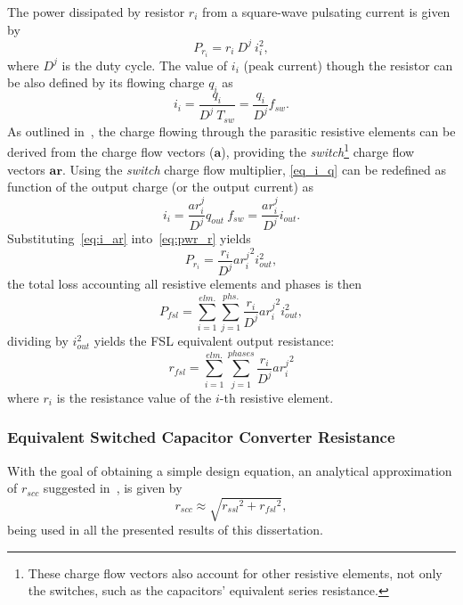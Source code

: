 The power dissipated by resistor $r_i$  from a square-wave pulsating current is given by
\begin{equation}
P_{r_i} = r_i~D^j~i_i^2,
\label{eq:pwr_r}
\end{equation}
where $D^j$ is the duty cycle. The value of $i_i$ (peak current) though the resistor can be also defined by its flowing charge $q_i$ as
\begin{equation}
i_i = \frac{q_i}{D^j~T_{sw}} = \frac{q_i}{D^j} f_{sw}.
\label{eq:i_q}
\end{equation}
As outlined in~\cite{Seeman:EECS-2009-78}, the charge flowing through the parasitic resistive elements can be derived from the charge flow vectors ($\mathbf{a}$), providing the \emph{switch}\footnote{These charge flow vectors also account for other resistive elements, not only the switches, such as the capacitors' equivalent series resistance.} charge flow vectors $\mathbf{ar}$. Using the \emph{switch} charge flow multiplier, \eqref{eq_i_q} can be redefined as function of the output charge (or the output current) as
\begin{equation}
i_i = \frac{ar_i^j}{D^j} q_{out}~f_{sw} = \frac{ar_i^j}{D^j} i_{out}.
\label{eq:i_ar}
\end{equation}
Substituting~\eqref{eq:i_ar} into~\eqref{eq:pwr_r} yields
\begin{equation}
P_{r_i} = \frac{r_i}{D^j}{ar_i^j}^2 i_{out}^2 ,
\label{eq:pwr_r_ar}
\end{equation}
the total loss accounting all resistive elements and phases is then
\begin{equation}
P_{fsl} = \sum_{i=1}^{elm.} \sum_{j=1}^{phs.}  \frac{r_i}{D^j}{ar_i^j}^2 i_{out}^2,
\label{eq:pwr_fsl}
\end{equation}
dividing by $i_{out}^2$ yields the FSL equivalent output resistance:
\begin{equation}
r_{fsl}=\sum_{i=1}^{elm.}\sum_{j=1}^{phases}\frac{r_i}{D^j}{ar_i^j}^2
\label{eq:r_fsl}
\end{equation}
where $r_i$ is the resistance value of the $i$-th resistive element.


\subsubsection{Equivalent Switched Capacitor Converter Resistance}
With the goal of obtaining a simple design equation, an analytical approximation of $r_{scc}$ suggested in~\cite{1998Arntzen,1999Maksimovic}, is given by
\begin{equation}
r_{scc} \approx \sqrt{{r_{ssl}}^2+{r_{fsl}}^2},
\label{eq:r_scc}
\end{equation}
being used in all the presented results of this dissertation.

